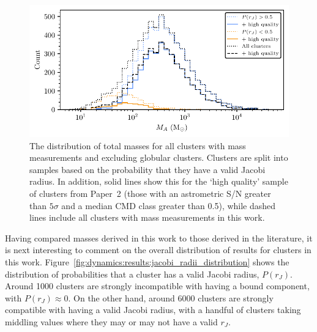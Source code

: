 \begin{figure}[t]
    \centering
    \includegraphics[width=\textwidth]{fig/c4/results_mass_distribution.pdf}
    \caption[The distribution of total masses for all clusters with mass measurements]{The distribution of total masses for all clusters with mass measurements and excluding globular clusters. Clusters are split into samples based on the probability that they have a valid Jacobi radius. In addition, solid lines show this for the `high quality' sample of clusters from Paper~2 (those with an astrometric S/N greater than $5\sigma$ and a median CMD class greater than 0.5), while dashed lines include all clusters with mass measurements in this work.}
    \label{fig:dynamics:results:mass_distribution}
\end{figure}

Having compared masses derived in this work to those derived in the literature, it is next interesting to comment on the overall distribution of results for clusters in this work. Figure~\ref{fig:dynamics:results:jacobi_radii_distribution} shows the distribution of probabilities that a cluster has a valid Jacobi radius, $P(r_J)$. Around 1000 clusters are strongly incompatible with having a bound component, with $P(r_J)\approx0$. On the other hand, around 6000 clusters are strongly compatible with having a valid Jacobi radius, with a handful of clusters taking middling values where they may or may not have a valid $r_J$.

